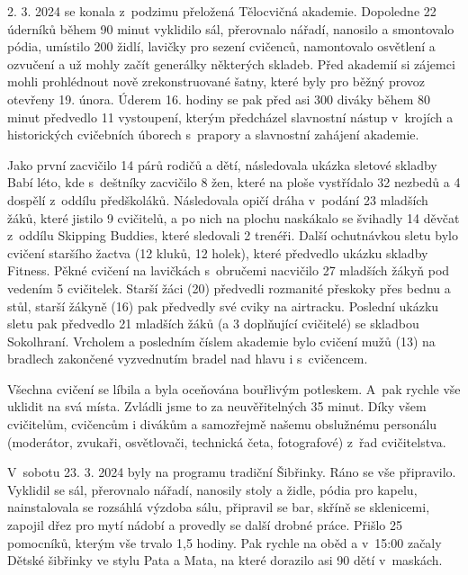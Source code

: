 \documentclass[11pt]{article}
\begin{document}
\vspace*{24pt}


2. 3. 2024 se konala z~podzimu přeložená Tělocvičná akademie. Dopoledne 22 úderníků během 90 minut vyklidilo sál, přerovnalo nářadí, nanosilo a smontovalo pódia, umístilo 200 židlí, lavičky pro sezení cvičenců, namontovalo osvětlení a ozvučení a už mohly začít generálky některých skladeb. Před akademií si zájemci mohli prohlédnout nově zrekonstruované šatny, které byly pro běžný provoz otevřeny 19. února. Úderem 16. hodiny se pak před asi 300 diváky během 80 minut předvedlo 11 vystoupení, kterým předcházel slavnostní nástup v~krojích a historických cvičebních úborech s~prapory a slavnostní zahájení akademie.

Jako první zacvičilo 14 párů rodičů a dětí, následovala ukázka sletové skladby Babí léto, kde s~deštníky zacvičilo 8 žen, které na ploše vystřídalo 32 nezbedů a 4 dospělí z~oddílu předškoláků. Následovala opičí dráha v~podání 23 mladších žáků, které jistilo 9 cvičitelů, a po nich na plochu naskákalo se švihadly 14 děvčat z~oddílu Skipping Buddies, které sledovali 2 trenéři. Další ochutnávkou sletu bylo cvičení staršího žactva (12 kluků, 12 holek), které předvedlo ukázku skladby Fitness. Pěkné cvičení na lavičkách s~obručemi nacvičilo 27 mladších žákyň pod vedením 5 cvičitelek. Starší žáci (20) předvedli rozmanité přeskoky přes bednu a stůl, starší žákyně (16) pak předvedly své cviky na airtracku. Poslední ukázku sletu pak předvedlo 21 mladších žáků (a 3 doplňující cvičitelé) se skladbou Sokolhraní. Vrcholem a posledním číslem akademie bylo cvičení mužů (13) na bradlech zakončené vyzvednutím bradel nad hlavu i s~cvičencem.

Všechna cvičení se líbila a byla oceňována bouřlivým potleskem. A~pak rychle vše uklidit na svá místa. Zvládli jsme to za neuvěřitelných 35 minut. Díky všem cvičitelům, cvičencům i divákům a samozřejmě našemu obslužnému personálu (moderátor, zvukaři, osvětlovači, technická četa, fotografové) z~řad cvičitelstva.  

V~sobotu 23. 3. 2024 byly na programu tradiční Šibřinky. Ráno se vše připravilo. Vyklidil se sál, přerovnalo nářadí, nanosily stoly a židle, pódia pro kapelu, nainstalovala se rozsáhlá výzdoba sálu, připravil se bar, skříně se sklenicemi, zapojil dřez pro mytí nádobí a provedly se další drobné práce. Přišlo 25 pomocníků, kterým vše trvalo 1,5 hodiny. Pak rychle na oběd a v~15:00 začaly Dětské šibřinky ve stylu Pata a Mata, na které dorazilo asi 90 dětí v~maskách.
\end{document}
